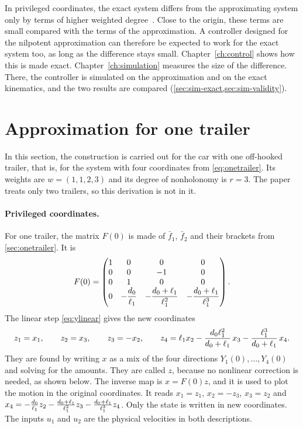In privileged coordinates, the exact system differs from the approximating
system only by terms of higher weighted degree~\cite{bellaiche2005}. Close to the
origin, these terms are small compared with the terms of the approximation. A
controller designed for the nilpotent approximation can therefore be expected to
work for the exact system too, as long as the difference stays small.
Chapter~\ref{ch:control} shows how this is made exact.
Chapter~\ref{ch:simulation} measures the size of the difference. There, the
controller is simulated on the approximation and on the exact kinematics, and the
two results are compared (\cref{sec:sim-exact,sec:sim-validity}).

\section{Approximation for one trailer}
\label{sec:approx1}

In this section, the construction is carried out for the car with one off-hooked
trailer, that is, for the system with four coordinates from
\eqref{eq:onetrailer}. Its weights are $w=(1,1,2,3)$ and its degree of
nonholonomy is $r=3$. The paper~\cite{zuyev2024} treats only two trailers, so this
derivation is not in it.

\paragraph{Privileged coordinates.}
For one trailer, the matrix $F(0)$ is made of $\bar f_1$, $\bar f_2$ and their
brackets from \cref{sec:onetrailer}. It is
\begin{equation}
  F(0)=\begin{pmatrix}
    1&0&0&0\\
    0&0&-1&0\\
    0&1&0&0\\
    0&-\dfrac{d_0}{\ell_1}&-\dfrac{d_0+\ell_1}{\ell_1^{2}}&-\dfrac{d_0+\ell_1}{\ell_1^{3}}
  \end{pmatrix}.
\end{equation}
The linear step \eqref{eq:ylinear} gives the new coordinates
\begin{equation}
  z_1=x_1,\qquad z_2=x_3,\qquad z_3=-x_2,\qquad
  z_4=\ell_1 x_2-\frac{d_0\ell_1^{2}}{d_0+\ell_1}\,x_3
      -\frac{\ell_1^{3}}{d_0+\ell_1}\,x_4 .
  \label{eq:xtoz1}
\end{equation}
They are found by writing $x$ as a mix of the four directions
$Y_1(0),\dots,Y_4(0)$ and solving for the amounts. They are called $z$, because
no nonlinear correction is needed, as shown below. The inverse map is
$x=F(0)z$, and it is used to plot the motion in the original coordinates. It
reads $x_1=z_1$, $x_2=-z_3$, $x_3=z_2$ and
$x_4=-\frac{d_0}{\ell_1}z_2-\frac{d_0+\ell_1}{\ell_1^{2}}z_3
-\frac{d_0+\ell_1}{\ell_1^{3}}z_4$.
Only the state is written in new coordinates. The inputs $u_1$ and $u_2$ are the
physical velocities in both descriptions.

